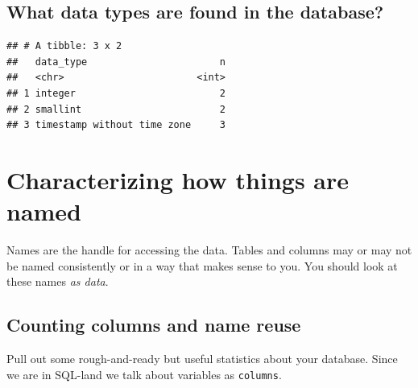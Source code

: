 \documentclass[]{book}
\newenvironment{Shaded}{\begin{snugshade}}{\end{snugshade}}
\newcommand{\DataTypeTok}[1]{\textcolor[rgb]{0.13,0.29,0.53}{#1}}
\newcommand{\KeywordTok}[1]{\textcolor[rgb]{0.13,0.29,0.53}{\textbf{#1}}}
\newcommand{\NormalTok}[1]{#1}
\newcommand{\OperatorTok}[1]{\textcolor[rgb]{0.81,0.36,0.00}{\textbf{#1}}}
\newcommand{\OtherTok}[1]{\textcolor[rgb]{0.56,0.35,0.01}{#1}}
\newcommand{\StringTok}[1]{\textcolor[rgb]{0.31,0.60,0.02}{#1}}
\theoremstyle{definition}
\theoremstyle{definition}
\theoremstyle{definition}
\theoremstyle{remark}
\begin{document}
\hypertarget{what-data-types-are-found-in-the-database}{%
\subsection{What data types are found in the
database?}\label{what-data-types-are-found-in-the-database}}

\begin{Shaded}
\end{Shaded}

\begin{verbatim}
## # A tibble: 3 x 2
##   data_type                       n
##   <chr>                       <int>
## 1 integer                         2
## 2 smallint                        2
## 3 timestamp without time zone     3
\end{verbatim}

\hypertarget{characterizing-how-things-are-named}{%
\section{Characterizing how things are
named}\label{characterizing-how-things-are-named}}

Names are the handle for accessing the data. Tables and columns may or
may not be named consistently or in a way that makes sense to you. You
should look at these names \emph{as data}.

\hypertarget{counting-columns-and-name-reuse}{%
\subsection{Counting columns and name
reuse}\label{counting-columns-and-name-reuse}}

Pull out some rough-and-ready but useful statistics about your database.
Since we are in SQL-land we talk about variables as \texttt{columns}.

\begin{Shaded}
\end{Shaded}
\end{document}
